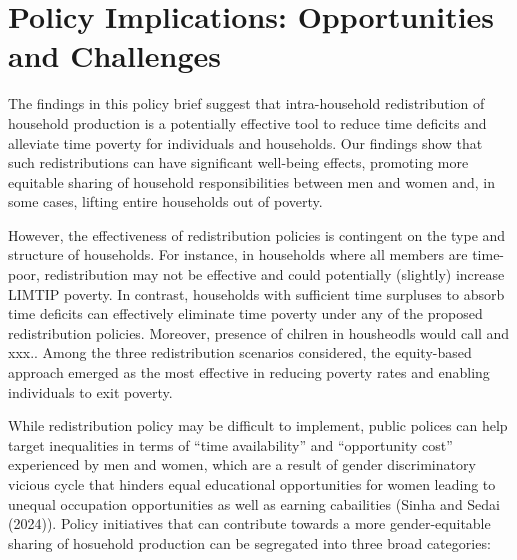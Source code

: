 \documentclass[
  11pt,
]{article}
\begin{document}
\section{Policy Implications: Opportunities and
Challenges}\label{policy-implications-opportunities-and-challenges}

The findings in this policy brief suggest that intra-household
redistribution of household production is a potentially effective tool
to reduce time deficits and alleviate time poverty for individuals and
households. Our findings show that such redistributions can have
significant well-being effects, promoting more equitable sharing of
household responsibilities between men and women and, in some cases,
lifting entire households out of poverty.

However, the effectiveness of redistribution policies is contingent on
the type and structure of households. For instance, in households where
all members are time-poor, redistribution may not be effective and could
potentially (slightly) increase LIMTIP poverty. In contrast, households
with sufficient time surpluses to absorb time deficits can effectively
eliminate time poverty under any of the proposed redistribution
policies. Moreover, presence of chilren in housheodls would call and
xxx.. Among the three redistribution scenarios considered, the
equity-based approach emerged as the most effective in reducing poverty
rates and enabling individuals to exit poverty.

While redistribution policy may be difficult to implement, public
polices can help target inequalities in terms of ``time availability''
and ``opportunity cost'' experienced by men and women, which are a
result of gender discriminatory vicious cycle that hinders equal
educational opportunities for women leading to unequal occupation
opportunities as well as earning cabailities (Sinha and Sedai (2024)).
Policy initiatives that can contribute towards a more gender-equitable
sharing of hosuehold production can be segregated into three broad
categories:
\end{document}
